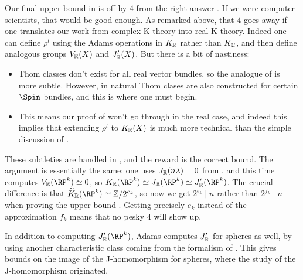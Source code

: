 \begin{remark}
  Our final upper bound in  is off by $4$ from the
  right answer . If we were computer
  scientists, that would be good enough. As remarked above, that $4$
  goes away if one translates our work from complex K-theory into real
  K-theory. Indeed one can define $\rho^l$ using the Adams operations
  in $K_{\mathbb{R}}$ rather than $K_{\mathbb{C}}$, and then define analogous groups
  $V_{\mathbb{R}}(X)$ and $J'_{\mathbb{R}}(X)$. But there is a bit of nastiness:
  \begin{itemize}
  \item Thom classes don't exist for all real vector bundles, so the
    analogue of  is more subtle. However, in
    \cite{abs-clifford} natural Thom clases are also constructed for
    certain $\Spin$ bundles, and this is where one must begin.
  \item This means our proof of  won't go through
    in the real case, and indeed this implies that extending $\rho^l$
    to $K_{\mathbb{R}}(X)$ is much more technical than the simple discussion of
    .
  \end{itemize}
  These subtleties are handled in \cite{adams-J-II}, and the reward is
  the correct bound. The argument is essentially the same: one uses
  $J_{\mathbb{R}}(n\lambda) = 0$ from , and this time computes
  $V_\R(\RP^k) \simeq 0$, so $K_\R(\RP^k) \simeq J_\R(\RP^k) \simeq
  J_\R'(\RP^k)$. The crucial difference is that $\til K_\R(\RP^k)
  \simeq \Z/2^{e_k}$, so now we get $2^{e_k} \mid n$ rather than
  $2^{f_k} \mid n$ when proving the upper bound
  . Getting precisely $e_k$ instead of the
  approximation $f_k$ means that no pesky $4$ will show up.
\end{remark}

\begin{remark}
  In addition to computing $J_\R'(\RP^k)$, Adams computes $J_{\mathbb{R}}'$
  for spheres as well, by using another characteristic class coming
  from the formalism of . This gives bounds on
  the image of the J-homomorphism for spheres, where the study of the
  J-homomorphism originated.
\end{remark}


\nocite{mathew-J, shah-vfields}





